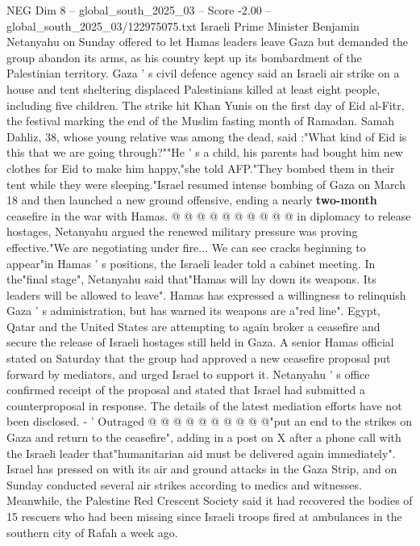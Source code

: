 \begin{textsample}{NEG Dim 8 – global\_south\_2025\_03 – Score -2.00 – global\_south\_2025\_03/122975075.txt}  \label{ex:f8_neg_072}
Israeli Prime Minister Benjamin Netanyahu on Sunday offered to let Hamas leaders leave Gaza but demanded the group abandon its arms, as his country kept up its bombardment of the Palestinian territory.
Gaza ' s civil defence agency said an Israeli air strike on a house and tent sheltering displaced Palestinians killed at least eight people, including five children.
The strike hit Khan Yunis on the first day of Eid al-Fitr, the festival marking the end of the Muslim fasting month of Ramadan.
Samah Dahliz, 38, whose young relative was among the dead, said :"What kind of Eid is this that we are going through?""He ' s a child, his parents had bought him new clothes for Eid to make him happy,"she told AFP."They bombed them in their tent while they were sleeping."Israel resumed intense bombing of Gaza on March 18 and then launched a new ground offensive, ending a nearly \textbf{two-month} ceasefire in the war with Hamas. @ @ @ @ @ @ @ @ @ @ in diplomacy to release hostages, Netanyahu argued the renewed military pressure was proving effective."We are negotiating under fire...
We can see cracks beginning to appear"in Hamas ' s positions, the Israeli leader told a cabinet meeting.
In the"final stage", Netanyahu said that"Hamas will lay down its weapons.
Its leaders will be allowed to leave".
Hamas has expressed a willingness to relinquish Gaza ' s administration, but has warned its weapons are a"red line".
Egypt, Qatar and the United States are attempting to again broker a ceasefire and secure the release of Israeli hostages still held in Gaza.
A senior Hamas official stated on Saturday that the group had approved a new ceasefire proposal put forward by mediators, and urged Israel to support it.
Netanyahu ' s office confirmed receipt of the proposal and stated that Israel had submitted a counterproposal in response.
The details of the latest mediation efforts have not been disclosed. - ' Outraged @ @ @ @ @ @ @ @ @ @"put an end to the strikes on Gaza and return to the ceasefire", adding in a post on X after a phone call with the Israeli leader that"humanitarian aid must be delivered again immediately".
Israel has pressed on with its air and ground attacks in the Gaza Strip, and on Sunday conducted several air strikes according to medics and witnesses.
Meanwhile, the Palestine Red Crescent Society said it had recovered the bodies of 15 rescuers who had been missing since Israeli troops fired at ambulances in the southern city of Rafah a week ago.

\end{textsample}
